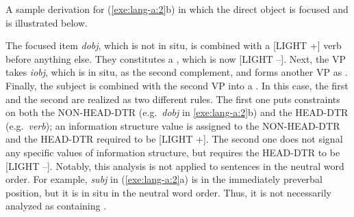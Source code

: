   



\noindent A sample derivation for (\ref{exe:lang-a:2}b) in which the
direct object is focused and  is illustrated below.




\noindent The focused item \textit{dobj}, which is not in
  situ, is combined with a [LIGHT +] verb before anything else. They
constitutes a , which is now [LIGHT --]. Next,
the VP takes \textit{iobj}, which is in situ, as the second
complement, and forms another VP as . Finally,
the subject is combined with the second VP into a
.  In this case, the first and the second
 are realized as two different rules. The first
one puts constraints on both the NON-HEAD-DTR (e.g.\ \textit{dobj} in
\ref{exe:lang-a:2}b) and the HEAD-DTR (e.g.\ \textit{verb}); an
information structure value  is assigned to the
NON-HEAD-DTR and the HEAD-DTR required to be [LIGHT +].
The second one does not signal any specific values of information
structure, but requires the HEAD-DTR to be [LIGHT --]. Notably, this
analysis is not applied to sentences in the neutral word order. For
example, \textit{subj} in (\ref{exe:lang-a:2}a) is in the immediately
preverbal position, but it is in situ in the neutral word
order. Thus, it is not necessarily analyzed as containing
.





